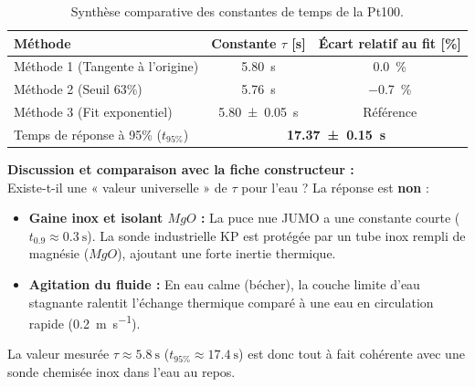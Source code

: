 \vspace{-4pt}
\begin{table}[H]
    \centering
    \small
    \setlength{\tabcolsep}{4pt}
    \renewcommand{\arraystretch}{0.95}
    \begin{tabularx}{0.75\textwidth}{Xcc}
        \toprule
        Méthode & Constante $\tau$ [s] & Écart relatif au fit [\%] \\
        \midrule
        Méthode 1 (Tangente à l'origine) & \qty{5.80}{\second} & \qty{0.0}{\percent} \\
        Méthode 2 (Seuil 63\%) & \qty{5.76}{\second} & \qty{-0.7}{\percent} \\
        Méthode 3 (Fit exponentiel) & \qty{5.80 \pm 0.05}{\second} & Référence \\
        \midrule
        Temps de réponse à 95\% ($t_{95\%}$) & \multicolumn{2}{c}{\textbf{\qty{17.37 \pm 0.15}{\second}}} \\
        \bottomrule
    \end{tabularx}
    \caption{Synthèse comparative des constantes de temps de la Pt100.}
    \label{tab:comparaison_tau}
\end{table}
\vspace{-6pt}

\noindent
\textbf{Discussion et comparaison avec la fiche constructeur :} \\
Existe-t-il une « valeur universelle » de $\tau$ pour l'eau ? La réponse est \textbf{non} :
\begin{itemize}[leftmargin=1.0cm,topsep=1pt,itemsep=0pt,parsep=0pt]
    \item \textbf{Gaine inox et isolant $MgO$ :} La puce nue JUMO a une constante courte ($t_{0.9} \approx \qty{0.3}{\second}$). La sonde industrielle KP est protégée par un tube inox rempli de magnésie ($MgO$), ajoutant une forte inertie thermique.
    \item \textbf{Agitation du fluide :} En eau calme (bécher), la couche limite d'eau stagnante ralentit l'échange thermique comparé à une eau en circulation rapide (\qty{0.2}{\meter\per\second}).
\end{itemize}
La valeur mesurée $\tau \approx \qty{5.8}{\second}$ ($t_{95\%} \approx \qty{17.4}{\second}$) est donc tout à fait cohérente avec une sonde chemisée inox dans l'eau au repos.
